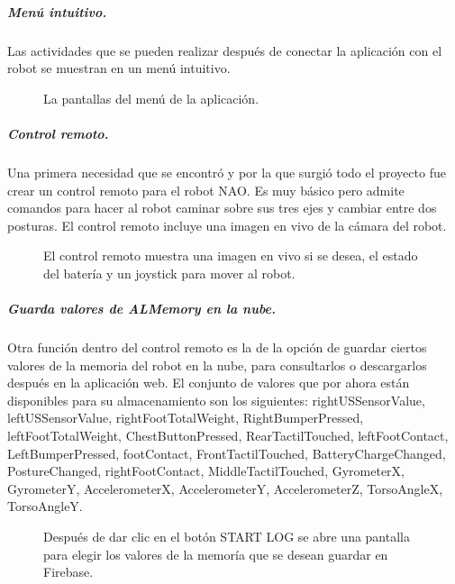 \subparagraph{Menú intuitivo.}
Las actividades que se pueden realizar después de conectar
la aplicación con el robot se muestran en un menú intuitivo.

\begin{figure}[!h]
    \centering
    \caption{La pantallas del menú de la aplicación.}
    \qquad
    \qquad
    \qquad
\end{figure}



\subparagraph{Control remoto.}
\label{\detokenize{users_docs:control-remoto-para-el-robot}}
Una primera necesidad que se encontró y por la que surgió todo el proyecto
fue crear un control remoto para el robot NAO. Es muy básico pero admite
comandos para hacer al robot caminar sobre sus tres ejes y cambiar entre dos
posturas. El control remoto incluye una imagen en vivo de la
cámara del robot.

\begin{figure}[!h]
    \centering
    \caption{El control remoto muestra una imagen en vivo si se desea, el estado del batería y un joystick para mover al robot.}
    \qquad

\end{figure}


\subparagraph{Guarda valores de ALMemory en la nube.}
\label{\detokenize{users_docs:guarda-valores-de-almemory-en-la-nube}}
Otra función dentro del control remoto es la de la opción de guardar ciertos
valores de la memoria del robot en la nube, para consultarlos o descargarlos
después en la aplicación web. El conjunto de valores que por ahora
están disponibles para su almacenamiento son los siguientes:
rightUSSensorValue, leftUSSensorValue, rightFootTotalWeight, RightBumperPressed, leftFootTotalWeight, ChestButtonPressed, RearTactilTouched, leftFootContact, LeftBumperPressed, footContact, FrontTactilTouched, BatteryChargeChanged, PostureChanged, rightFootContact, MiddleTactilTouched, GyrometerX, GyrometerY, AccelerometerX, AccelerometerY, AccelerometerZ, TorsoAngleX, TorsoAngleY.

\begin{figure}[!h]
    \centering
    \caption{Después de dar clic en el botón START LOG se abre una pantalla para elegir los valores de la memoría que se desean guardar
    en Firebase.}
    \qquad
    \qquad
\end{figure}


